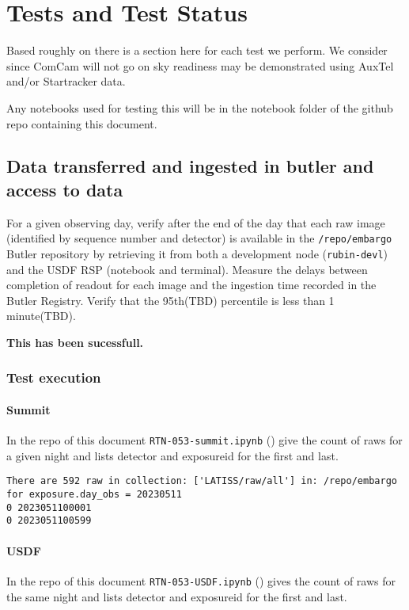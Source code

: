 \section{Tests and Test Status} \label{sec:testing}
Based roughly on  there is a section here for each test we perform.
We consider since ComCam will not go on sky readiness may be demonstrated using AuxTel and/or Startracker data.

Any notebooks used for testing this will be in the notebook folder of the github repo containing this document.

\subsection{Data transferred and ingested in butler and access to data}
For a given observing day, verify after the end of the day that each raw image (identified by sequence number and detector) is available in the \texttt{/repo/embargo} Butler repository by retrieving it from both a development node (\texttt{rubin-devl}) and the USDF RSP (notebook and terminal).
Measure the delays between completion of readout for each image and the ingestion time recorded in the Butler Registry.
Verify that the 95th(TBD) percentile is less than 1 minute(TBD).

\textbf{This has been sucessfull.}

\subsubsection{Test execution}
\paragraph{Summit}
In the repo of this document \texttt{RTN-053-summit.ipynb} () give the count of raws for a given night and lists detector and exposureid for the first and last.

\begin{verbatim}
There are 592 raw in collection: ['LATISS/raw/all'] in: /repo/embargo for exposure.day_obs = 20230511
0 2023051100001
0 2023051100599
\end{verbatim}

\paragraph{USDF}
In the repo of this document \texttt{RTN-053-USDF.ipynb} () gives the count of raws for the same night and lists detector and exposureid for the first and last.

